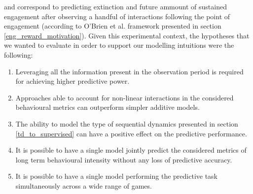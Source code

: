 and correspond to predicting extinction and future ammount of sustained engagement after observing a handful of interactions following the point of engagement (according to O'Brien et al. \cite{o2008user} framework presented in section \ref{eng_reward_motivation}). Given this experimental context, the hypotheses that we wanted to evaluate in order to support our modelling intuitions were the following:
\begin{enumerate}
    \item Leveraging all the information present in the observation period is required for achieving higher predictive power.
    \item Approaches able to account for non-linear interactions in the considered behavioural metrics can outperform simpler additive models.
    \item The ability to model the type of sequential dynamics presented in section \ref{td_to_supervised} can have a positive effect on the predictive performance.
    \item It is possible to have a single model jointly predict the considered metrics of long term behavioural intensity without any loss of predictive accuracy.
    \item It is possible to have a single model performing the predictive task simultaneously across a wide range of games.
\end{enumerate}

